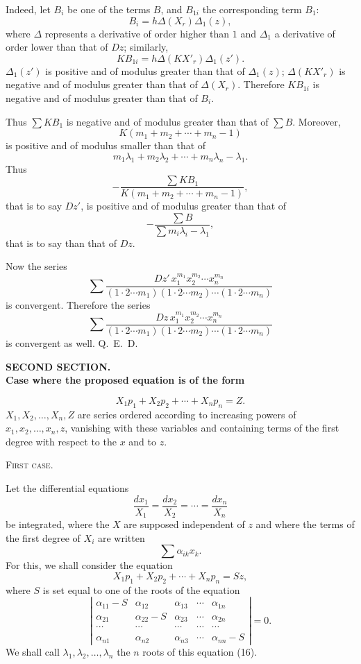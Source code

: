 \documentclass[11pt]{article}
\begin{document}
Indeed, let $B_i$ be one of the terms $B$, and $B_{1i}$ the corresponding term $B_1$:
\[
B_i=h\Delta(X_r)\Delta_1(z),
\]
where $\Delta$ represents a derivative of order higher than $1$ and $\Delta_1$ a derivative of order lower than that of $Dz$; similarly,
\[
KB_{1i}=h\Delta(KX'_r)\Delta_1(z').
\]
$\Delta_1(z')$ is positive and of modulus greater than that of $\Delta_1(z)$; $\Delta(KX'_r)$ is negative and of modulus greater than that of $\Delta(X_r)$. Therefore $KB_{1i}$ is negative and of modulus greater than that of $B_i$.

Thus $\sum KB_1$ is negative and of modulus greater than that of $\sum B$.
Moreover,
\[
K(m_1+m_2+\cdots+m_n-1)
\]
is positive and of modulus smaller than that of
\[
m_1\lambda_1+m_2\lambda_2+\cdots+m_n\lambda_n-\lambda_1.
\]
Thus
\[
-\frac{\sum KB_1}{K(m_1+m_2+\cdots+m_n-1)},
\]
that is to say $Dz'$, is positive and of modulus greater than that of
\[
-\frac{\sum B}{\sum m_i\lambda_i-\lambda_1},
\]
that is to say than that of $Dz$.

Now the series
\[
\sum
\frac{Dz'\,x_1^{m_1}x_2^{m_2}\cdots x_n^{m_n}}
{(1\cdot2\cdots m_1)(1\cdot2\cdots m_2)\cdots(1\cdot2\cdots m_n)}
\]
is convergent. Therefore the series
\[
\sum
\frac{Dz\,x_1^{m_1}x_2^{m_2}\cdots x_n^{m_n}}
{(1\cdot2\cdots m_1)(1\cdot2\cdots m_2)\cdots(1\cdot2\cdots m_n)}
\]
is convergent as well. \hfill\mbox{Q. E. D.}

\begin{center}
{\bfseries SECOND SECTION.}\\[0.8em]
{\bfseries Case where the proposed equation is of the form}
\end{center}
\[
X_1p_1+X_2p_2+\cdots+X_np_n=Z.
\]
$X_1,X_2,\ldots,X_n,Z$ are series ordered according to increasing powers of $x_1,x_2,\ldots,x_n,z$, vanishing with these variables and containing terms of the first degree with respect to the $x$ and to $z$.

\begin{center}
{\scshape First case.}
\end{center}

Let the differential equations
\[
\frac{dx_1}{X_1}=\frac{dx_2}{X_2}=\cdots=\frac{dx_n}{X_n}
\]
be integrated, where the $X$ are supposed independent of $z$ and where the terms of the first degree of $X_i$ are written
\[
\sum \alpha_{ik}x_k.
\]
For this, we shall consider the equation
\begin{equation*}\tag{15}
X_1p_1+X_2p_2+\cdots+X_np_n=Sz,
\end{equation*}
where $S$ is set equal to one of the roots of the equation
\begin{equation*}\tag{16}
\left|
\begin{array}{ccccc}
\alpha_{11}-S&\alpha_{12}&\alpha_{13}&\cdots&\alpha_{1n}\\
\alpha_{21}&\alpha_{22}-S&\alpha_{23}&\cdots&\alpha_{2n}\\
\cdots&\cdots&\cdots&\cdots&\cdots\\
\alpha_{n1}&\alpha_{n2}&\alpha_{n3}&\cdots&\alpha_{nn}-S
\end{array}
\right|=0.
\end{equation*}
We shall call $\lambda_1,\lambda_2,\ldots,\lambda_n$ the $n$ roots of this equation (16).
\end{document}
